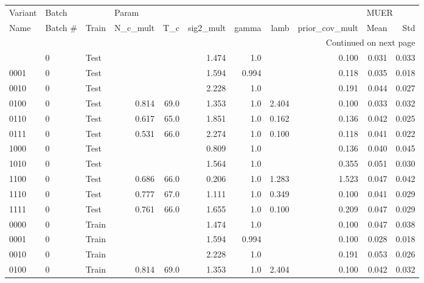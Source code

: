 \begin{longtable}{lllrrrrrrrr}
\toprule
Variant & \multicolumn{2}{l}{Batch} & \multicolumn{6}{l}{Param} & \multicolumn{2}{l}{MUER} \\
   Name & Batch \# &  Train & N\_c\_mult &    T\_c & sig2\_mult & gamma &  lamb & prior\_cov\_mult &  Mean &   Std \\
\midrule
\endhead
\midrule
\multicolumn{11}{r}{{Continued on next page}} \\
\midrule
\endfoot

\bottomrule
\endlastfoot
   0000 &       0 &  Test &       &     &     1.474 & 1.0 &    &          0.100 & 0.031 & 0.033 \\
   0001 &       0 &  Test &       &     &     1.594 & 0.994 &    &          0.118 & 0.035 & 0.018 \\
   0010 &       0 &  Test &       &     &     2.228 & 1.0 &    &          0.191 & 0.044 & 0.027 \\
   0100 &       0 &  Test &    0.814 & 69.0 &     1.353 & 1.0 & 2.404 &          0.100 & 0.033 & 0.032 \\
   0110 &       0 &  Test &    0.617 & 65.0 &     1.851 & 1.0 & 0.162 &          0.136 & 0.042 & 0.025 \\
   0111 &       0 &  Test &    0.531 & 66.0 &     2.274 & 1.0 & 0.100 &          0.118 & 0.041 & 0.022 \\
   1000 &       0 &  Test &       &     &     0.809 & 1.0 &    &          0.136 & 0.040 & 0.045 \\
   1010 &       0 &  Test &       &     &     1.564 & 1.0 &    &          0.355 & 0.051 & 0.030 \\
   1100 &       0 &  Test &    0.686 & 66.0 &     0.206 & 1.0 & 1.283 &          1.523 & 0.047 & 0.042 \\
   1110 &       0 &  Test &    0.777 & 67.0 &     1.111 & 1.0 & 0.349 &          0.100 & 0.041 & 0.029 \\
   1111 &       0 &  Test &    0.761 & 66.0 &     1.655 & 1.0 & 0.100 &          0.209 & 0.047 & 0.029 \\
   0000 &       0 &   Train &       &     &     1.474 & 1.0 &    &          0.100 & 0.047 & 0.038 \\
   0001 &       0 &   Train &       &     &     1.594 & 0.994 &    &          0.100 & 0.028 & 0.018 \\
   0010 &       0 &   Train &       &     &     2.228 & 1.0 &    &          0.191 & 0.053 & 0.026 \\
   0100 &       0 &   Train &    0.814 & 69.0 &     1.353 & 1.0 & 2.404 &          0.100 & 0.042 & 0.032 \\

\end{longtable}
